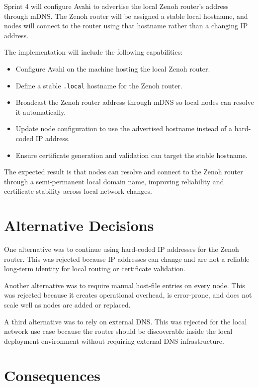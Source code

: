 \documentclass[11pt]{article}
\begin{document}
Sprint 4 will configure Avahi to advertise the local Zenoh router's address through mDNS. The Zenoh router will be assigned a stable local hostname, and nodes will connect to the router using that hostname rather than a changing IP address.

The implementation will include the following capabilities:

\begin{itemize}
    \item Configure Avahi on the machine hosting the local Zenoh router.
    \item Define a stable \texttt{.local} hostname for the Zenoh router.
    \item Broadcast the Zenoh router address through mDNS so local nodes can resolve it automatically.
    \item Update node configuration to use the advertised hostname instead of a hard-coded IP address.
    \item Ensure certificate generation and validation can target the stable hostname.
\end{itemize}

The expected result is that nodes can resolve and connect to the Zenoh router through a semi-permanent local domain name, improving reliability and certificate stability across local network changes.

\section{Alternative Decisions}

One alternative was to continue using hard-coded IP addresses for the Zenoh router. This was rejected because IP addresses can change and are not a reliable long-term identity for local routing or certificate validation.

Another alternative was to require manual host-file entries on every node. This was rejected because it creates operational overhead, is error-prone, and does not scale well as nodes are added or replaced.

A third alternative was to rely on external DNS. This was rejected for the local network use case because the router should be discoverable inside the local deployment environment without requiring external DNS infrastructure.

\section{Consequences}
\end{document}
